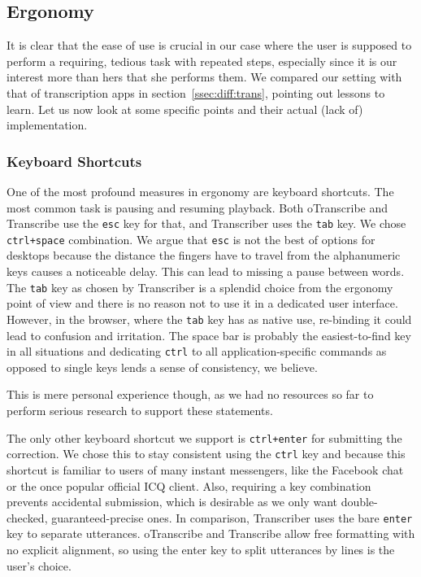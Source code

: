 \documentclass{svproc}
\begin{document}
\subsection{Ergonomy}

It is clear that the ease of use is crucial in our case where the user is
supposed to perform a requiring, tedious task with repeated steps, especially
since it is our interest more than hers that she performs them. We compared our
setting with that of transcription apps in section~\ref{ssec:diff:trans},
pointing out lessons to learn. Let us now look at some specific points and their
actual (lack of) implementation.

\subsubsection{Keyboard Shortcuts}

One of the most profound measures in ergonomy are keyboard shortcuts. The most
common task is pausing and resuming playback. Both oTranscribe and Transcribe
use the \texttt{esc} key for that, and Transcriber uses the \texttt{tab} key.
We chose \texttt{ctrl+space} combination. We argue that \texttt{esc} is not the
best of options for desktops because the distance the fingers have to travel
from the alphanumeric keys causes a noticeable delay. This can lead to missing a
pause between words. The \texttt{tab} key as chosen by Transcriber is a splendid
choice from the ergonomy point of view and there is no reason not to use it in a
dedicated user interface. However, in the browser, where the \texttt{tab} key
has as native use, re-binding it could lead to confusion and irritation. The
space bar is probably the easiest-to-find key in all situations and dedicating
\texttt{ctrl} to all application-specific commands as opposed to single keys
lends a sense of consistency, we believe.

This is mere personal experience though, as we had no resources so far to
perform serious research to support these statements.

The only other keyboard shortcut we support is \texttt{ctrl+enter} for
submitting the correction. We chose this to stay consistent using the
\texttt{ctrl} key and because this shortcut is familiar to users of many instant
messengers, like the Facebook chat or the once popular official ICQ client.
Also, requiring a key combination prevents accidental submission, which is
desirable as we only want double-checked, guaranteed-precise ones. In
comparison, Transcriber uses the bare \texttt{enter} key to separate utterances.
oTranscribe and Transcribe allow free formatting with no explicit alignment, so
using the enter key to split utterances by lines is the user's choice.
\end{document}
